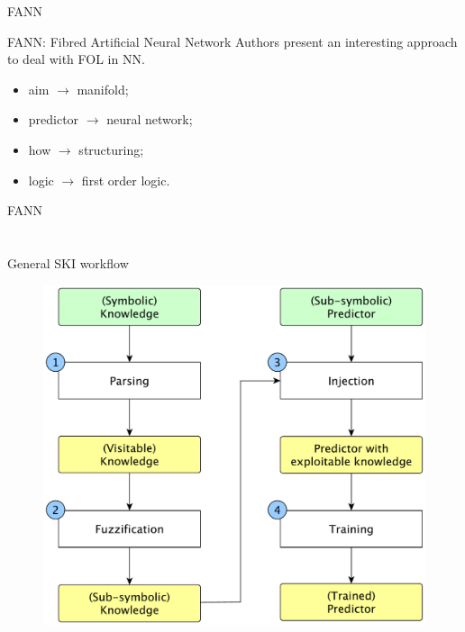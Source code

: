 \documentclass[presentation]{beamer}\mode<presentation>{\usetheme{AMSBolognaFC}}
\begin{document}
\begin{frame}[allowframebreaks]{FANN}
    \begin{block}{FANN: Fibred Artificial Neural Network }
        Authors present an interesting approach to deal with FOL in NN.
        \begin{itemize}
            \item aim $\rightarrow$ manifold;
            \item predictor $\rightarrow$ neural network;
            \item how $\rightarrow$ structuring;
            \item logic $\rightarrow$ first order logic.
        \end{itemize}        
    \end{block}
\end{frame}

\begin{frame}{FANN}

\end{frame}

\section{\psyki}


\begin{frame}{General SKI workflow}
    
    \begin{figure}
        \centering
        \includegraphics[width=0.8\textheight]{figures/ski-workflow.pdf}
    \end{figure}
    
\end{frame}
\end{document}

